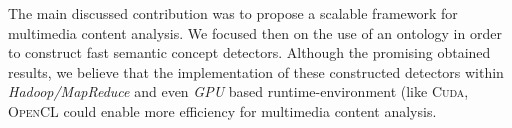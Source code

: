 	
	The main discussed contribution was to propose a scalable framework for
		multimedia content analysis. We focused then on the use of an ontology in order to construct 
		fast semantic concept detectors. Although the promising obtained results, we believe that the
		implementation of these constructed detectors within \emph{Hadoop/MapReduce} and even \emph{GPU} 
		based runtime-environment (like \textsc{Cuda, OpenCL} \citep{Mahmoudi2015,Osipyan2015,Dantas2015,Peters2015}
		could enable more efficiency for multimedia content analysis.


